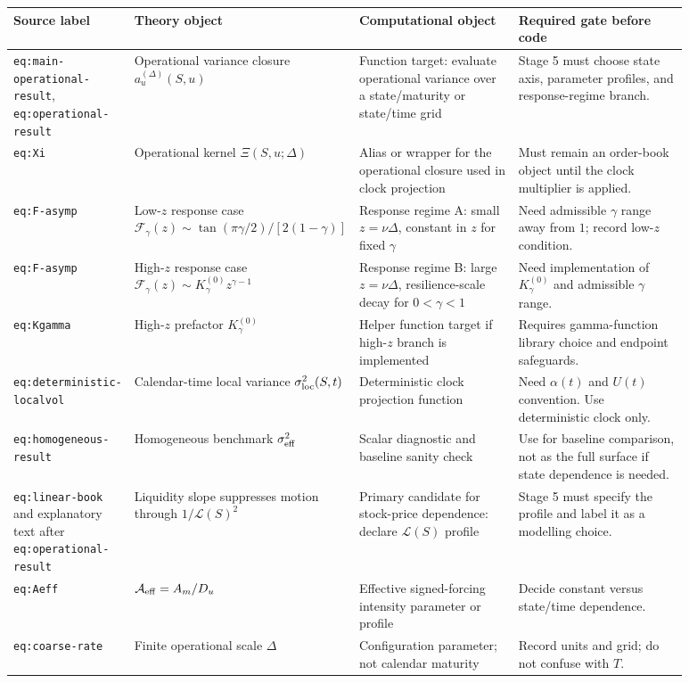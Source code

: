 \documentclass[11pt]{article}
\begin{document}
\begin{longtable}{p{0.15\linewidth}p{0.21\linewidth}p{0.25\linewidth}p{0.27\linewidth}}
\toprule
Source label & Theory object & Computational object & Required gate before code \\
\midrule
\texttt{eq:main-operational-result}, \texttt{eq:operational-result} &
Operational variance closure \(a_u^{(\Delta)}(S,u)\) &
Function target: evaluate operational variance over a state/maturity or state/time grid &
Stage 5 must choose state axis, parameter profiles, and response-regime branch. \\
\midrule
\texttt{eq:Xi} &
Operational kernel \(\Xi(S,u;\Delta)\) &
Alias or wrapper for the operational closure used in clock projection &
Must remain an order-book object until the clock multiplier is applied. \\
\midrule
\texttt{eq:F-asymp} &
Low-\(z\) response case \( \mathcal F_\gamma(z)\sim \tan(\pi\gamma/2)/[2(1-\gamma)]\) &
Response regime A: small \(z=\nu\Delta\), constant in \(z\) for fixed \(\gamma\) &
Need admissible \(\gamma\) range away from \(1\); record low-\(z\) condition. \\
\midrule
\texttt{eq:F-asymp} &
High-\(z\) response case \( \mathcal F_\gamma(z)\sim K_\gamma^{(0)}z^{\gamma-1}\) &
Response regime B: large \(z=\nu\Delta\), resilience-scale decay for \(0<\gamma<1\) &
Need implementation of \(K_\gamma^{(0)}\) and admissible \(\gamma\) range. \\
\midrule
\texttt{eq:Kgamma} &
High-\(z\) prefactor \(K_\gamma^{(0)}\) &
Helper function target if high-\(z\) branch is implemented &
Requires gamma-function library choice and endpoint safeguards. \\
\midrule
\texttt{eq:deterministic-localvol} &
Calendar-time local variance \(\sigma_{\rm loc}^2(S,t)\) &
Deterministic clock projection function &
Need \(\alpha(t)\) and \(U(t)\) convention. Use deterministic clock only. \\
\midrule
\texttt{eq:homogeneous-result} &
Homogeneous benchmark \(\sigma_{\rm eff}^2\) &
Scalar diagnostic and baseline sanity check &
Use for baseline comparison, not as the full surface if state dependence is needed. \\
\midrule
\texttt{eq:linear-book} and explanatory text after \texttt{eq:operational-result} &
Liquidity slope suppresses motion through \(1/\mathcal L(S)^2\) &
Primary candidate for stock-price dependence: declare \(\mathcal L(S)\) profile &
Stage 5 must specify the profile and label it as a modelling choice. \\
\midrule
\texttt{eq:Aeff} &
\(\mathcal A_{\rm eff}=A_m/D_u\) &
Effective signed-forcing intensity parameter or profile &
Decide constant versus state/time dependence. \\
\midrule
\texttt{eq:coarse-rate} &
Finite operational scale \(\Delta\) &
Configuration parameter; not calendar maturity &
Record units and grid; do not confuse with \(T\). \\
\bottomrule
\end{longtable}
\end{document}
